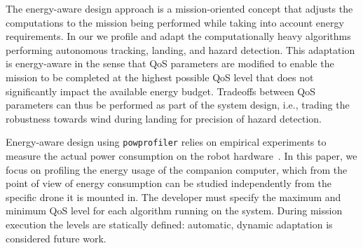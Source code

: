 \documentclass[conference]{IEEEtran}
\newcommand{\stt}[1]{{\small\tt #1}} %
\newcommand{\powprof}{\stt{powprofiler}}
\begin{document}
The energy-aware design approach is a mission-oriented concept that adjusts
the computations to the mission being performed while taking into
account energy requirements. %
In our %
we profile and adapt the
computationally heavy algorithms performing autonomous tracking,
landing, and hazard detection. This adaptation is energy-aware
in the sense that QoS parameters are modified
to enable the mission to be completed at the highest possible QoS
level that does not significantly impact the available energy budget. Tradeoffs
between QoS parameters can thus be performed as part of the system design, i.e., trading
the robustness towards wind during landing for precision of hazard
detection.

Energy-aware design using \powprof{} relies on empirical
experiments to measure the actual power consumption on the robot
hardware~\cite{seewald2019coarse}.
%
In this paper, we focus on 
profiling the energy usage of the companion computer,
which from the point of view of energy consumption
can be studied independently from the specific drone it is mounted in.
%
The developer must specify the maximum and minimum QoS level for
each algorithm running on the system.  During mission execution the
levels are statically defined: automatic, dynamic adaptation %
is 
considered future work.
\end{document}
